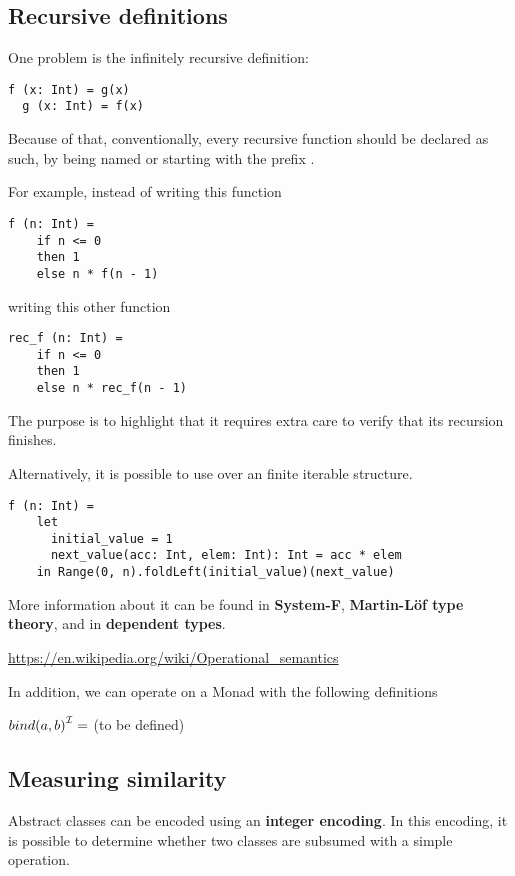 \subsection{Recursive definitions}


One problem is the infinitely recursive definition:
\begin{lstlisting}[label={lst:exampleOfRecursion}]
  f (x: Int) = g(x)
  g (x: Int) = f(x)
\end{lstlisting}

Because of that, conventionally, every recursive function should be declared as such, by being named or starting with the prefix .

For example, instead of writing this function
\begin{lstlisting}[label={lst:exampleOfFactorialBadNaming}]
  f (n: Int) =
    if n <= 0
    then 1
    else n * f(n - 1)
\end{lstlisting}

writing this other function
\begin{lstlisting}[label={lst:exampleOfFactorialGoodNaming}]
  rec_f (n: Int) =
    if n <= 0
    then 1
    else n * rec_f(n - 1)
\end{lstlisting}

The purpose is to highlight that it requires extra care to verify that its recursion finishes.

Alternatively, it is possible to use  over an finite iterable structure.
\begin{lstlisting}[label={lst:exampleOfFactorialFoldLeft}]
  f (n: Int) =
    let
      initial_value = 1
      next_value(acc: Int, elem: Int): Int = acc * elem
    in Range(0, n).foldLeft(initial_value)(next_value)
\end{lstlisting}

More information about it can be found in \textbf{System-F}, \textbf{Martin-L\"{o}f type theory}, and in \textbf{dependent types}.


\url{https://en.wikipedia.org/wiki/Operational_semantics}

In addition, we can operate on a Monad with the following definitions

${bind(a, b)}^{\mathcal{I}} = $ (to be defined)

\subsection{Measuring similarity}

Abstract classes can be encoded using an \textbf{integer encoding}.
In this encoding, it is possible to determine whether two classes are subsumed with a simple operation.

